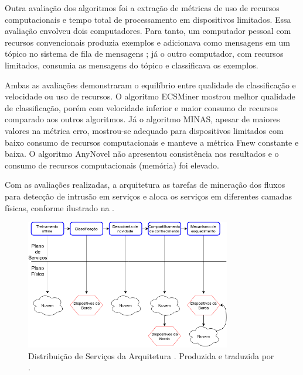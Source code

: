 Outra avaliação dos algoritmos foi a extração de métricas de uso de recursos
computacionais e tempo total de processamento em dispositivos limitados.
Essa avaliação envolveu dois computadores.
Para tanto, um computador pessoal com recursos
convencionais produzia exemplos e adicionava como mensagens em um tópico no
sistema de fila de mensagens \kafka; já o outro computador, com recursos
limitados, consumia as mensagens do tópico e classificava os exemplos.

Ambas as avaliações demonstraram o equilíbrio entre qualidade de classificação e
velocidade ou uso de recursos.
O algoritmo ECSMiner mostrou melhor qualidade de classificação, porém com
velocidade inferior e maior consumo de recursos comparado aos outros algoritmos.
Já o algoritmo MINAS, apesar de maiores valores na métrica erro, mostrou-se
adequado para dispositivos limitados com baixo consumo de recursos
computacionais e manteve a métrica Fnew constante e baixa.
O algoritmo AnyNovel não apresentou consistência nos resultados e o consumo
de recursos computacionais (memória) foi elevado.


Com as avaliações realizadas, a arquitetura \idsiot {} as
tarefas de mineração dos fluxos para detecção de intrusão em serviços e aloca os
serviços em diferentes camadas físicas, conforme ilustrado na .

\begin{figure}[hbt]
\centering
\includegraphics[width=0.8\textwidth]{figuras/idsa-iot-quali-004.png}
\caption{Distribuição de Serviços da Arquitetura \idsiot.
Produzida e traduzida por .}
\label{fig:ids-iot}
\end{figure}

